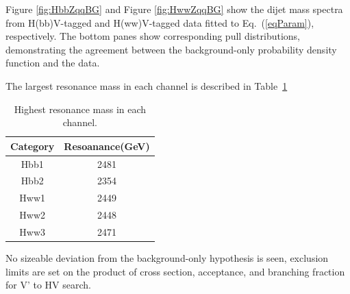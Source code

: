 Figure \ref{fig:HbbZqqBG} and Figure \ref{fig:HwwZqqBG} show the dijet
 mass spectra from
H(bb)V-tagged and H(ww)V-tagged data 
fitted to Eq.~(\ref{eqParam}), respectively. 
The bottom panes show corresponding pull
distributions, demonstrating the agreement between the background-only
probability density function and the data.

The largest resonance mass in each channel is described 
in Table~\ref{table:highestMass}

\begin{table}[htbp]
\begin{center}
\caption{Highest resonance mass in each channel.}
\label{table:highestMass}
\begin{tabular}{cc}
\hline
Category & \multicolumn{1}{l|}{Resoanance(GeV)} \\ \hline
Hbb1 & 2481 \\ 
Hbb2 & 2354 \\ 
Hww1 & 2449 \\
Hww2 & 2448 \\ 
Hww3 & 2471 \\ \hline
\end{tabular}
\end{center}
\end{table}



No sizeable deviation from the background-only hypothesis is seen,
exclusion limits are set on the product of cross section, 
acceptance, and branching fraction for
V' to HV search. 





